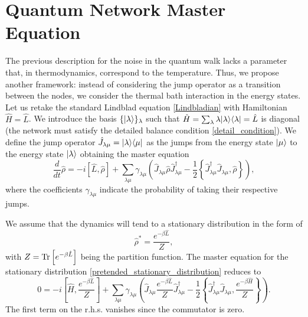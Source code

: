 \section{Quantum Network Master Equation}\label{C_quantum_network_master_equation}

The previous description for the noise in the quantum walk lacks a parameter that, in thermodynamics, correspond to the temperature. 
Thus, we propose another framework: instead of considering the jump operator as a transition between the nodes, we consider the thermal bath interaction in the energy states.
Let us retake the standard Lindblad equation \eqref{Lindbladian} with Hamiltonian $\hat H = \hat L$.
We introduce the basis $\{\lvert\lambda\rangle\}_{\lambda}$ such that $\hat H = \sum_\lambda \lambda\lvert\lambda\rangle\langle\lambda\rvert = \hat L$ is diagonal (the network must satisfy the detailed balance condition \eqref{detail_condition}).
We define the jump operator $\hat J_{\lambda\mu} = \lvert\lambda\rangle\langle\mu\rvert$ as the jumps from the energy state $\lvert\mu\rangle$ to the energy state $\lvert\lambda\rangle$ obtaining the master equation
\begin{equation}\label{Lindblad_energy_jump}
    \frac{d}{dt}\hat\rho = -i\left[\hat L,\hat\rho\right] + \sum_{\lambda\mu} \gamma_{\lambda\mu} \left(\hat J_{\lambda\mu} \hat\rho \hat J^\dagger_{\lambda\mu} - \frac{1}{2}\left\{ \hat J^\dagger_{\lambda\mu}\hat J_{\lambda\mu}, \hat\rho\right\} \right),
\end{equation}
where the coefficients $\gamma_{\lambda\mu}$ indicate the probability of taking their respective jumps.

We assume that the dynamics will tend to a stationary distribution in the form of
\begin{equation}\label{pretended_stationary_distribution}
    \hat \rho^* = \frac{e^{-\beta\hat L}}{Z},
\end{equation}
with $Z = \operatorname{Tr}\left[e^{-\beta\hat L}\right]$ being the partition function.
The master equation for the stationary distribution \eqref{pretended_stationary_distribution} reduces to
\begin{equation}\label{cancel_master_equation}
    0 = -i\left[\hat H, \frac{e^{-\beta\hat L}}{Z}\right] + \sum_{\lambda\mu} \gamma_{\lambda\mu} \left(\hat J_{\lambda\mu}  \frac{e^{-\beta\hat L}}{Z} \hat J^\dagger_{\lambda\mu} - \frac{1}{2}\left\{ \hat J^\dagger_{\lambda\mu}\hat J_{\lambda\mu},  \frac{e^{-\beta\hat H}}{Z}\right\} \right).
\end{equation}
The first term on the r.h.s. vanishes since the commutator is zero.

